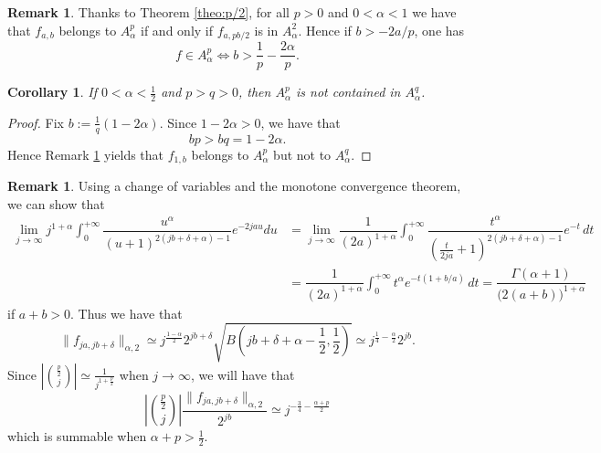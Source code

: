 \documentclass[12pt]{amsart}
\newtheorem{corollary}[theorem]{Corollary}
\theoremstyle{definition}
\newtheorem{remark}[theorem]{Remark}
\numberwithin{equation}{section}
\begin{document}
        \begin{remark}
        \label{rem:fab}
            Thanks to Theorem \ref{theo:p/2}, for all $p>0$ and $0<\alpha<1$ we have that $f_{a, b}$ belongs to $A^p_\alpha$ if and only if $f_{a, pb/2}$ is in $A^2_\alpha$. Hence if $b>-2a/p$, one has
            \[
                f\in A^p_\alpha\iff b>\frac{1}{p}-\frac{2\alpha}{p}.
            \]
        \end{remark}
       
        \begin{corollary}
        \label{coro:notsub}
            If $0 < \alpha <\tfrac{1}{2}$ and $p > q>0$, then $A^p_\alpha$ is not contained in $A^q_\alpha$.
        \end{corollary}

        \begin{proof}
Fix $b:=\frac{1}{q}(1-2\alpha)$.  Since $1-2\alpha>0$, we have that
\[
bp>bq=1-2\alpha.
\]
Hence Remark \ref{rem:fab} yields that $f_{1, b}$ belongs to $A^p_\alpha$ but not to $A^q_\alpha$.
        
           
        \end{proof}

        \begin{remark} \label{rem:power_est}
            Using a change of variables and the monotone convergence theorem, we can show that
                \begin{align*}
                    \lim_{j \to \infty} j^{1 + \alpha} \int_0^{+\infty} \dfrac{u^\alpha}{(u + 1)^{2(jb + \delta + \alpha) - 1}} e^{-2jau} du & = \lim_{j \to \infty} \dfrac{1}{(2a)^{1 + \alpha}} \int_0^{+\infty} \dfrac{t^{\alpha}}{ \left( \frac{t}{2ja} + 1 \right)^{2(jb+\delta + \alpha)-1}} e^{-t} \, dt \\
                        & = \dfrac{1}{(2a)^{1+\alpha}}\int_0^{+\infty} t^\alpha e^{-t (1 + b/a)} \, dt = \dfrac{\Gamma (\alpha + 1)}{\big(2 (a+b) \big)^{1+\alpha}}
                \end{align*}
                if $a + b > 0$. Thus we have that
                \[
                    \|f_{ja, jb+\delta}\|_{\alpha,2} \simeq j^{\frac{1 - \alpha}{2}} 2^{jb + \delta} \sqrt{B \left( jb + \delta + \alpha - \dfrac{1}{2}, \dfrac{1}{2} \right)} \simeq j^{\frac{1}{4} - \frac{\alpha}{2}} 2^{jb}.
                \]
                Since $\left|\binom{\frac{p}{2}}{j}\right|\simeq \frac{1}{j^{1+\frac{p}{2}}}$ when $j \to \infty$, we will have that
                \[
                    \left|\binom{\frac{p}{2}}{j}\right| \dfrac{\|f_{ja, jb+\delta}\|_{\alpha,2}}{2^{jb}} \simeq j^{-\frac{3}{4} - \frac{\alpha + p}{2}}
                \]
                which is summable when $\alpha + p > \frac{1}{2}$.
        \end{remark}
    
\end{document}
